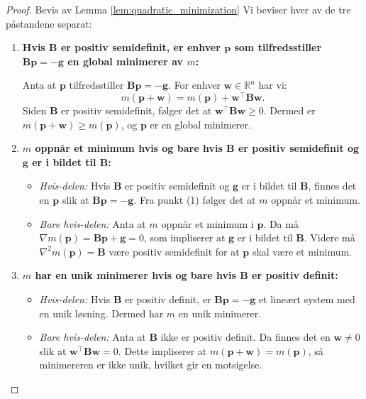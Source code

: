 \begin{proof}{Bevis av Lemma \ref{lem:quadratic_minimization}}
	Vi beviser hver av de tre påstandene separat:

	\begin{enumerate}
		\item \textbf{Hvis \(\symbf{B}\) er positiv semidefinit, er enhver \(\symbf{p}\) som tilfredsstiller \(\symbf{B}\symbf{p} = -\symbf{g}\) en global minimerer av \(m\):}

		Anta at \(\symbf{p}\) tilfredsstiller \(\symbf{B}\symbf{p} = -\symbf{g}\). For enhver \(\symbf{w} \in \mathbb{R}^n\) har vi:
		\[
		m(\symbf{p} + \symbf{w}) = m(\symbf{p}) + \symbf{w}^\top \symbf{B} \symbf{w}.
		\]
		Siden \(\symbf{B}\) er positiv semidefinit, følger det at \(\symbf{w}^\top \symbf{B} \symbf{w} \geq 0\). Dermed er \(m(\symbf{p} + \symbf{w}) \geq m(\symbf{p})\), og \(\symbf{p}\) er en global minimerer.

		\item \textbf{\(m\) oppnår et minimum hvis og bare hvis \(\symbf{B}\) er positiv semidefinit og \(\symbf{g}\) er i bildet til \(\symbf{B}\):}

		\begin{itemize}
			\item \textit{Hvis-delen:} Hvis \(\symbf{B}\) er positiv semidefinit og \(\symbf{g}\) er i bildet til \(\symbf{B}\), finnes det en \(\symbf{p}\) slik at \(\symbf{B}\symbf{p} = -\symbf{g}\). Fra punkt (1) følger det at \(m\) oppnår et minimum.
			\item \textit{Bare hvis-delen:} Anta at \(m\) oppnår et minimum i \(\symbf{p}\). Da må \(\nabla m(\symbf{p}) = \symbf{B}\symbf{p} + \symbf{g} = 0\), som impliserer at \(\symbf{g}\) er i bildet til \(\symbf{B}\). Videre må \(\nabla^2 m(\symbf{p}) = \symbf{B}\) være positiv semidefinit for at \(\symbf{p}\) skal være et minimum.
		\end{itemize}

		\item \textbf{\(m\) har en unik minimerer hvis og bare hvis \(\symbf{B}\) er positiv definit:}

		\begin{itemize}
			\item \textit{Hvis-delen:} Hvis \(\symbf{B}\) er positiv definit, er \(\symbf{B}\symbf{p} = -\symbf{g}\) et lineært system med en unik løsning. Dermed har \(m\) en unik minimerer.
			\item \textit{Bare hvis-delen:} Anta at \(\symbf{B}\) ikke er positiv definit. Da finnes det en \(\symbf{w} \neq 0\) slik at \(\symbf{w}^\top \symbf{B} \symbf{w} = 0\). Dette impliserer at \(m(\symbf{p} + \symbf{w}) = m(\symbf{p})\), så minimereren er ikke unik, hvilket gir en motsigelse.
		\end{itemize}
	\end{enumerate}
\end{proof}


